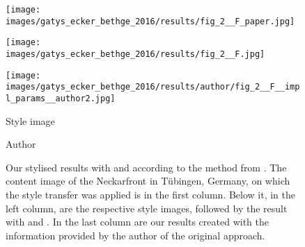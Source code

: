 \begin{figure}[H]
\begin{minipage}[t]{0.24\textwidth}
	\end{minipage}
	\hfill%
	\begin{minipage}[t]{0.24\textwidth}
		\centering
		\texttt{[image: images/gatys\_ecker\_bethge\_2016/results/fig\_2\_\_F\_paper.jpg]}
	\end{minipage}
	\hfill%
	\begin{minipage}[t]{0.24\textwidth}
		\centering
		\texttt{[image: images/gatys\_ecker\_bethge\_2016/results/fig\_2\_\_F.jpg]}
	\end{minipage}
	\hfill%
	\begin{minipage}[t]{0.24\textwidth}
		\centering
		\texttt{[image: images/gatys\_ecker\_bethge\_2016/results/author/fig\_2\_\_F\_\_impl\_params\_\_author2.jpg]}
	\end{minipage}
	\hfill%
	\begin{minipage}[t]{0.24\textwidth}
		\centering
		Style image
	\end{minipage}
	\hfill%
	\begin{minipage}[t]{0.24\textwidth}
		\centering
		\paper{}
	\end{minipage}
	\hfill%
	\begin{minipage}[t]{0.24\textwidth}
		\centering
		\implementation{}
	\end{minipage}
	\hfill%
	\begin{minipage}[t]{0.24\textwidth}
		\centering
		Author
	\end{minipage}
	\caption{Our stylised results with \paper{} and \implementation{} according to the method from \cite{GEB2016}. The content image of the Neckarfront in Tübingen, Germany, on which the style transfer was applied is in the first column. Below it, in the left column, are the respective style images, followed by the result with \paper{} and \implementation{}. In the last column are our results created with the information provided by the author of the original approach.}
	\label{fig:GEB2016_fig_2}
\end{figure}


